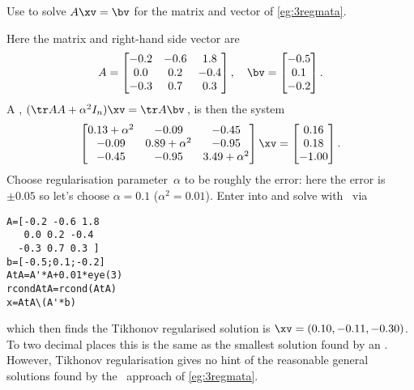 \begin{example} \label{eg:}
Use  to solve \(A\xv=\bv\) for the matrix and vector of \autoref{eg:3regmata}.
\begin{solution} 
Here the matrix and right-hand side vector are
\begin{equation*}
A=\begin{bmatrix} -0.2&-0.6&1.8
\\ 0.0&0.2&-0.4
\\ -0.3&0.7&0.3 \end{bmatrix}, \quad
\bv=\begin{bmatrix} -0.5
\\ 0.1
\\ -0.2
 \end{bmatrix}.
\end{equation*}
A , \((\tr AA+\alpha^2I_n)\xv=\tr A\bv\)\,, is then the system
\begin{equation*}
\begin{bmatrix} 0.13+\alpha^2&-0.09&-0.45
\\-0.09&0.89+\alpha^2 &-0.95
\\-0.45&-0.95&3.49+\alpha^2\end{bmatrix}\xv
=\begin{bmatrix} 0.16\\0.18\\-1.00 \end{bmatrix}.
\end{equation*}
Choose regularisation parameter~\(\alpha\) to be roughly the error: here the error is~\(\pm0.05\) so let's choose \(\alpha=0.1\) (\(\alpha^2=0.01\)).
Enter into and solve with \script\ via
\begin{verbatim}
A=[-0.2 -0.6 1.8
   0.0 0.2 -0.4
  -0.3 0.7 0.3 ]
b=[-0.5;0.1;-0.2]
AtA=A'*A+0.01*eye(3)
rcondAtA=rcond(AtA)
x=AtA\(A'*b)
\end{verbatim}
\setbox\ajrqrbox\hbox{}%
\marginpar{\usebox{\ajrqrbox\\[2ex]}}%
which then finds the Tikhonov regularised solution is \(\xv=(0.10,-0.11,-0.30)\).
To two decimal places this is the same as the smallest solution found by an \svd.
However, Tikhonov regularisation gives no hint of the reasonable general solutions found by the \svd\ approach of \autoref{eg:3regmata}.
\end{solution}
\end{example}



